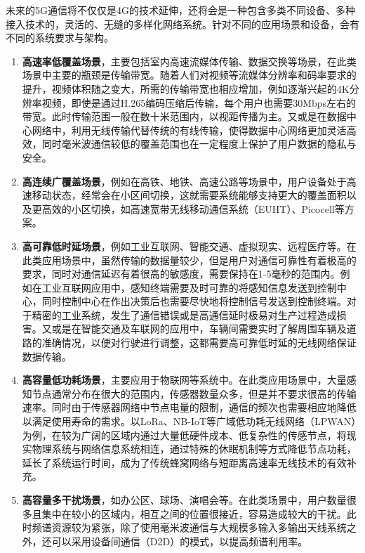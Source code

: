 未来的5G通信将不仅仅是4G的技术延伸，还将会是一种包含多类不同设备、多种接入技术的，灵活的、无缝的多样化网络系统\cite{bogale2016massive}。针对不同的应用场景和设备，会有不同的系统要求与架构。

\begin{enumerate}
	\item \textbf{高速率低覆盖场景}，主要包括室内高速流媒体传输、数据交换等场景，在此类场景中主要的瓶颈是传输带宽。随着人们对视频等流媒体分辨率和码率要求的提升，视频体积随之变大，所需的传输带宽也相应增加，例如逐渐兴起的4K分辨率视频，即使是通过H.265编码压缩后传输，每个用户也需要30Mbps左右的带宽。此时传输范围一般在数十米范围内，以视距传播为主。又或是在数据中心网络中，利用无线传输代替传统的有线传输，使得数据中心网络更加灵活高效，同时毫米波通信较低的覆盖范围也在一定程度上保护了用户数据的隐私与安全。

	\item \textbf{高连续广覆盖场景}，例如在高铁、地铁、高速公路等场景中，用户设备处于高速移动状态，经常会在小区间切换，这就需要系统能够支持更大的覆盖面积以及更高效的小区切换，如高速宽带无线移动通信系统（EUHT）、Picocell等方案。

	\item \textbf{高可靠低时延场景}，例如工业互联网、智能交通、虚拟现实、远程医疗等。在此类应用场景中，虽然传输的数据量较少，但是用户对通信可靠性有着极高的要求，同时对通信延迟有着很高的敏感度，需要保持在1-5毫秒的范围内。例如在工业互联网应用中，感知终端需要及时可靠的将感知信息发送到控制中心，同时控制中心在作出决策后也需要尽快地将控制信号发送到控制终端。对于精密的工业系统，发生了通信错误或是高通信延时极易对生产过程造成损害。又或是在智能交通及车联网的应用中，车辆间需要实时了解周围车辆及道路的准确情况，以便对行驶进行调整，这都需要高可靠低时延的无线网络保证数据传输。

	\item \textbf{高容量低功耗场景}，主要应用于物联网等系统中。在此类应用场景中，大量感知节点通常分布在很大的范围内，传感器数量众多，但是并不要求很高的传输速率。同时由于传感器网络中节点电量的限制，通信的频次也需要相应地降低以满足使用寿命的需求。以LoRa、NB-IoT等广域低功耗无线网络（LPWAN）为例，在较为广阔的区域内通过大量低硬件成本、低复杂性的传感节点，将现实物理系统与网络信息系统相连，通过特殊的休眠机制等方式降低节点功耗，延长了系统运行时间，成为了传统蜂窝网络与短距离高速率无线技术的有效补充。

	\item \textbf{高容量多干扰场景}，如办公区、球场、演唱会等。在此类场景中，用户数量很多且集中在较小的区域内，相互之间的位置很接近，容易造成较大的干扰。此时频谱资源较为紧张，除了使用毫米波通信与大规模多输入多输出天线系统之外，还可以采用设备间通信（D2D）的模式，以提高频谱利用率。
\end{enumerate}


